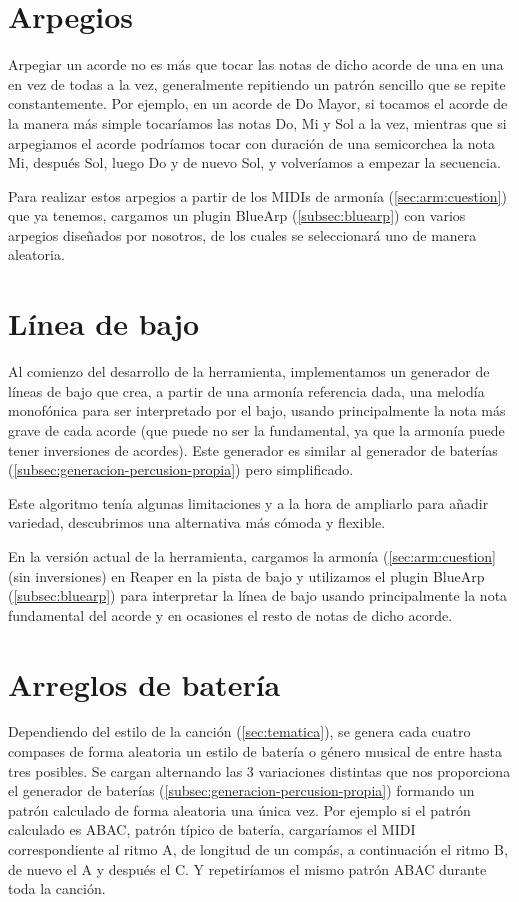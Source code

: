 \section{Arpegios}
Arpegiar un acorde no es más que tocar las notas de dicho acorde de una en una en vez de todas a la vez, generalmente repitiendo un patrón sencillo que se repite constantemente. Por ejemplo, en un acorde de Do Mayor, si tocamos el acorde de la manera más simple tocaríamos las notas Do, Mi y Sol a la vez, mientras que si arpegiamos el acorde podríamos tocar con duración de una semicorchea la nota Mi, después Sol, luego Do y de nuevo Sol, y volveríamos a empezar la secuencia.

Para realizar estos arpegios a partir de los MIDIs de armonía (\ref{sec:arm:cuestion}) que ya tenemos, cargamos un plugin  BlueArp (\ref{subsec:bluearp}) con varios arpegios diseñados por nosotros, de los cuales se seleccionará uno de manera aleatoria.

\section{Línea de bajo}
Al comienzo del desarrollo de la herramienta, implementamos un generador de líneas de bajo que crea, a partir de una armonía referencia dada, una melodía monofónica para ser interpretado por el bajo, usando principalmente la nota más grave de cada acorde (que puede no ser la fundamental, ya que la armonía puede tener inversiones de acordes). Este generador es similar al generador de baterías (\ref{subsec:generacion-percusion-propia}) pero simplificado.

Este algoritmo tenía algunas limitaciones y a la hora de ampliarlo para añadir variedad, descubrimos una alternativa más cómoda y flexible.

En la versión actual de la herramienta, cargamos la armonía (\ref{sec:arm:cuestion} (sin inversiones) en Reaper en la pista de bajo y utilizamos el plugin BlueArp (\ref{subsec:bluearp}) para interpretar la línea de bajo usando principalmente la nota fundamental del acorde y en ocasiones el resto de notas de dicho acorde.

\section{Arreglos de batería}
Dependiendo del estilo de la canción (\ref{sec:tematica}), se genera cada cuatro compases de forma aleatoria un estilo de batería o género musical de entre hasta tres posibles. Se cargan alternando las 3 variaciones distintas que nos proporciona el generador de baterías (\ref{subsec:generacion-percusion-propia}) formando un patrón calculado de forma aleatoria una única vez. Por ejemplo si el patrón calculado es ABAC, patrón típico de batería, cargaríamos el MIDI correspondiente al ritmo A, de longitud de un compás, a continuación el ritmo B, de nuevo el A y después el C. Y repetiríamos el mismo patrón ABAC durante toda la canción.

